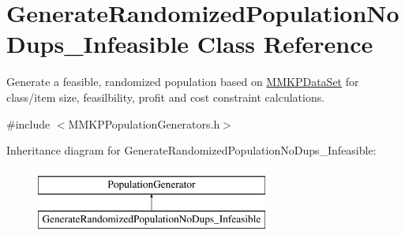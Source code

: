 \hypertarget{class_generate_randomized_population_no_dups___infeasible}{\section{Generate\+Randomized\+Population\+No\+Dups\+\_\+\+Infeasible Class Reference}
\label{class_generate_randomized_population_no_dups___infeasible}
}


Generate a feasible, randomized population based on \hyperlink{class_m_m_k_p_data_set}{M\+M\+K\+P\+Data\+Set} for class/item size, feasilbility, profit and cost constraint calculations.  




{\ttfamily \#include $<$M\+M\+K\+P\+Population\+Generators.\+h$>$}

Inheritance diagram for Generate\+Randomized\+Population\+No\+Dups\+\_\+\+Infeasible\+:\begin{figure}[H]
\begin{center}
\leavevmode
\includegraphics[height=2.000000cm]{class_generate_randomized_population_no_dups___infeasible}
\end{center}
\end{figure}
